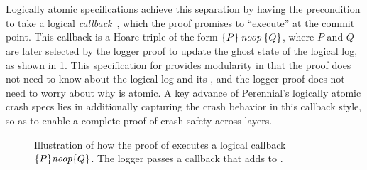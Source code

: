 Logically atomic specifications achieve this separation by having the precondition to 
take a logical \emph{callback}~\cite{jacobs:logatom}, which the proof promises to ``execute'' at the commit point.
This callback is a Hoare triple of the form $\hoare{P}{\SKIP}{Q}$, where $P$ and $Q$ are later selected
by the logger proof to update the  ghost state of the logical log, as shown in \cref{fig:circ-callback}.
This
specification for  provides modularity in that the  proof
does not need to know about the logical log and its , and the logger
proof does not need to worry about why  is atomic.  A key
advance of Perennial's logically atomic crash specs lies in additionally capturing the
crash behavior in this callback style, so as to enable a complete
proof of crash safety across layers.

\begin{figure}
  
  \caption{Illustration of how the proof of  executes a logical
callback $\{P\}\mathit{noop}\{Q\}$. The logger passes a callback that adds  to .}
  \label{fig:circ-callback}
\end{figure}


